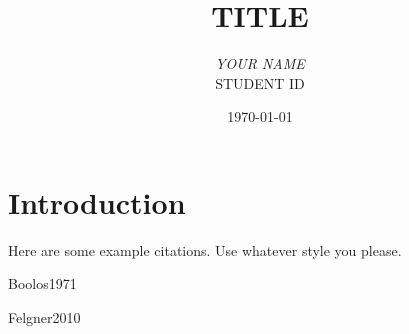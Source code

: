 \documentclass[12pt]{article}
\makeatletter
\DeclareRobustCommand\citepos%
  {\begingroup
   \let\NAT@nmfmt\NAT@posfmt%
   \NAT@swafalse\let\NAT@ctype\z@\NAT@partrue
   \@ifstar{\NAT@fulltrue\NAT@citetp}{\NAT@fullfalse\NAT@citetp}
  }
\let\NAT@orig@nmfmt\NAT@nmfmt %
\def\NAT@posfmt#1{%
  \StrRemoveBraces{#1}[\NAT@temp]%
  \IfEndWith{\NAT@temp}{s}
    {\NAT@orig@nmfmt{#1'}}
    {\NAT@orig@nmfmt{#1's}}}
\makeatother
\begin{document}
\title{\sc TITLE}
\author{\textit{YOUR NAME}\\ \small STUDENT ID} 
\date{\today}
\maketitle
\thispagestyle{empty}



\doublespacing

\section{Introduction}
  \label{Intro}

Here are some example citations. Use whatever style you please.

\cite{Russell1908}

\cite{Laan1996}

\citep{Weyl1946}

\citep{Ramsey2013}

\citepos{Boolos1971}

\citepos{Felgner2010}

\citet{Cartwright1994}

\citet{Williamson2003}












\newpage
\begin{footnotesize} %
\singlespacing %
\setlength{\bibsep}{5pt} %
\thispagestyle{empty} %
\end{footnotesize} %
\end{document}
